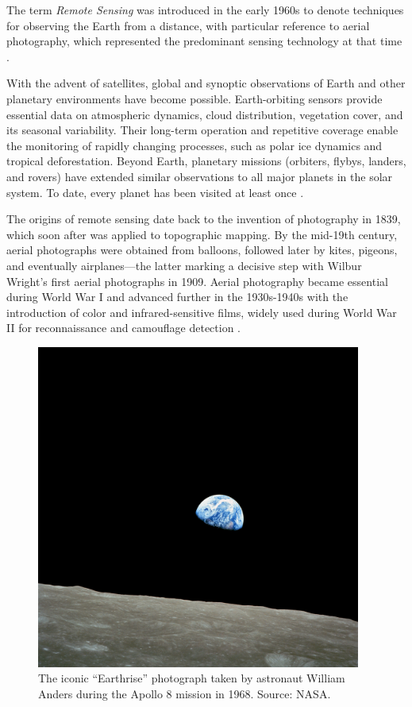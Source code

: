 The term \textit{Remote Sensing} was introduced in the early 1960s to denote techniques for observing the Earth from a distance, with particular reference to aerial photography, which represented the predominant sensing technology at that time \cite{book_Satellite_RS}.

With the advent of satellites, global and synoptic observations of Earth and other planetary environments have become possible. Earth-orbiting sensors provide essential data on atmospheric dynamics, cloud distribution, vegetation cover, and its seasonal variability. Their long-term operation and repetitive coverage enable the monitoring of rapidly changing processes, such as polar ice dynamics and tropical deforestation. Beyond Earth, planetary missions (orbiters, flybys, landers, and rovers) have extended similar observations to all major planets in the solar system. To date, every planet has been visited at least once \cite{book_Physics_Techniques_RS}.

The origins of remote sensing date back to the invention of photography in 1839, which soon after was applied to topographic mapping. By the mid-19th century, aerial photographs were obtained from balloons, followed later by kites, pigeons, and eventually airplanes—the latter marking a decisive step with Wilbur Wright's first aerial photographs in 1909. Aerial photography became essential during World War I and advanced further in the 1930s-1940s with the introduction of color and infrared-sensitive films, widely used during World War II for reconnaissance and camouflage detection \cite{book_Physics_Techniques_RS,book_Satellite_RS}.

\begin{figure}[H]
  \centering
  \includegraphics[width=0.95\textwidth]{img/earthrise.jpg}
  \caption{The iconic “Earthrise” photograph taken by astronaut William Anders during the Apollo 8 mission in 1968. Source: NASA.}
  \label{fig:earthrise}
\end{figure}

